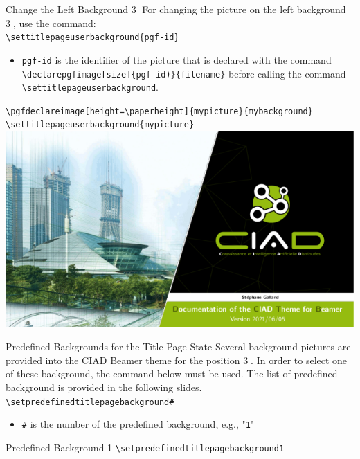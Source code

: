 \documentclass[english,sectioncirclenumberstyle]{ciadbeamer}
\begin{document}
\begin{frame}[t]{Change the Left Background \textcircled{3}}
	\smaller For changing the picture on the left background \textcircled{3}, use the command: \\[.25cm]
	\texttt{{\textbackslash}settitlepageuserbackground\{pgf-id\}} \\[.25cm]
	\begin{itemize}
		\item \texttt{pgf-id} is the identifier of the picture that is declared with the command \texttt{{\textbackslash}declarepgfimage[size]\{pgf-id)\}\{filename\}} before calling the command \texttt{{\textbackslash}settitlepageuserbackground}.
	\end{itemize}
	\begin{example}
		\texttt{{\textbackslash}pgfdeclareimage[height={\textbackslash}paperheight]\{mypicture\}\{mybackground\}} \\
		\texttt{{\textbackslash}settitlepageuserbackground\{mypicture\}} \\
		\centering\includegraphics[width=.25\linewidth]{frontpage3}
	\end{example}
\end{frame}

\begin{frame}{{Predefined Backgrounds} for the Title Page State}
	Several background pictures are provided into the CIAD Beamer theme for the position \textcircled{3}. In order to select one of these background, the command below must be used. The list of predefined background is provided in the following slides. \\[.5cm]
	\texttt{{\textbackslash}setpredefinedtitlepagebackground{\#}} \\[.5cm]
	\begin{itemize}
		\item \texttt{\#} is the number of the predefined background, e.g., "\texttt{1}"
	\end{itemize}
\end{frame}

\begin{frame}{{Predefined Background} 1}
	\centering\texttt{{\textbackslash}setpredefinedtitlepagebackground1} \\[.5cm]
\end{frame}
\end{document}
